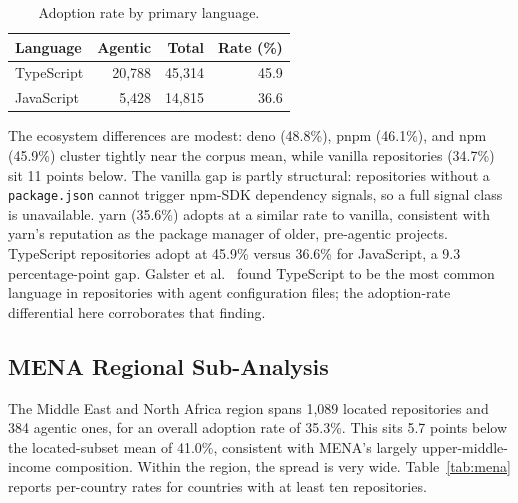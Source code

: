\begin{table}[h]
\centering
\caption{Adoption rate by primary language.}
\label{tab:breakdown_lang}
\begin{tabular}{@{}lrrr@{}}
\toprule
Language & Agentic & Total & Rate (\%) \\
\midrule
TypeScript & 20,788 & 45,314 & 45.9 \\
JavaScript &  5,428 & 14,815 & 36.6 \\
\bottomrule
\end{tabular}
\end{table}

The ecosystem differences are modest: deno (48.8\%), pnpm (46.1\%), and npm (45.9\%) cluster tightly near the corpus mean, while vanilla repositories (34.7\%) sit 11 points below. The vanilla gap is partly structural: repositories without a \texttt{package.json} cannot trigger npm-SDK dependency signals, so a full signal class is unavailable. yarn (35.6\%) adopts at a similar rate to vanilla, consistent with yarn's reputation as the package manager of older, pre-agentic projects. TypeScript repositories adopt at 45.9\% versus 36.6\% for JavaScript, a 9.3 percentage-point gap. Galster et al.~\cite{galsterConfig2026} found TypeScript to be the most common language in repositories with agent configuration files; the adoption-rate differential here corroborates that finding.

\subsection{MENA Regional Sub-Analysis}

The Middle East and North Africa region spans 1,089 located repositories and 384 agentic ones, for an overall adoption rate of 35.3\%. This sits 5.7 points below the located-subset mean of 41.0\%, consistent with MENA's largely upper-middle-income composition. Within the region, the spread is very wide. Table~\ref{tab:mena} reports per-country rates for countries with at least ten repositories.

